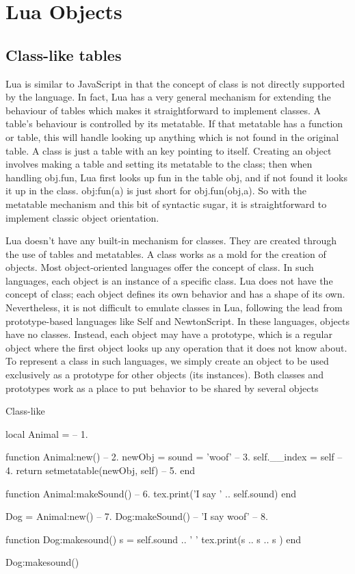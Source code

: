 \chapter{Lua Objects}


\section{Class-like tables}
Lua is similar to JavaScript in that the concept of class is not directly supported by the language. In fact, Lua has a very general mechanism for extending the behaviour of tables which makes it straightforward to implement classes. A table’s behaviour is controlled by its metatable. If that metatable has a  function or table, this will handle looking up anything which is not found in the original table. A class is just a table with an  key pointing to itself. Creating an object involves making a table and setting its metatable to the class; then when handling obj.fun, Lua first looks up fun in the table obj, and if not found it looks it up in the class. obj:fun(a) is just short for obj.fun(obj,a). So with the metatable mechanism and this bit of syntactic sugar, it is straightforward to implement classic object orientation.

Lua doesn't have any built-in mechanism for classes. They are created through the use of tables
and metatables. A class works as a mold for the creation of objects. Most object-oriented languages
offer the concept of class. In such languages, each object is an instance
of a specific class. Lua does not have the concept of class; each object defines
its own behavior and has a shape of its own. Nevertheless, it is not difficult to
emulate classes in Lua, following the lead from prototype-based languages like
Self and NewtonScript. In these languages, objects have no classes. Instead,
each object may have a prototype, which is a regular object where the first object
looks up any operation that it does not know about. To represent a class in
such languages, we simply create an object to be used exclusively as a prototype
for other objects (its instances). Both classes and prototypes work as a place to
put behavior to be shared by several objects
\begin{texexample}{Class-like}{}
\begin{luacode}
local Animal = {}                                      -- 1.

function Animal:new()                      -- 2.
  newObj = {sound = 'woof'}                -- 3.
  self.__index = self                      -- 4.
  return setmetatable(newObj, self)        -- 5.
end

function Animal:makeSound()                   -- 6.
  tex.print('I say ' .. self.sound)
end

Dog = Animal:new()                          -- 7.
Dog:makeSound()  -- 'I say woof'         -- 8.

function Dog:makesound()
  s = self.sound .. ' '
  tex.print(s .. s .. s )
end

Dog:makesound()
  
\end{luacode}
\end{texexample}

